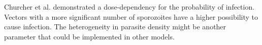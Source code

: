 \documentclass[a4paper, 12pt, twoside]{article}
\begin{document}
Churcher et al.\cite{Churcher2017a} demonstrated a dose-dependency for the probability of infection.
Vectors with a more significant number of sporozoites have a higher possibility to cause infection.
The heterogeneity in parasite density might be another parameter that could be implemented in other models.

%
%
%
%
%
%
%
%
%
%
%
%
%
\end{document}
